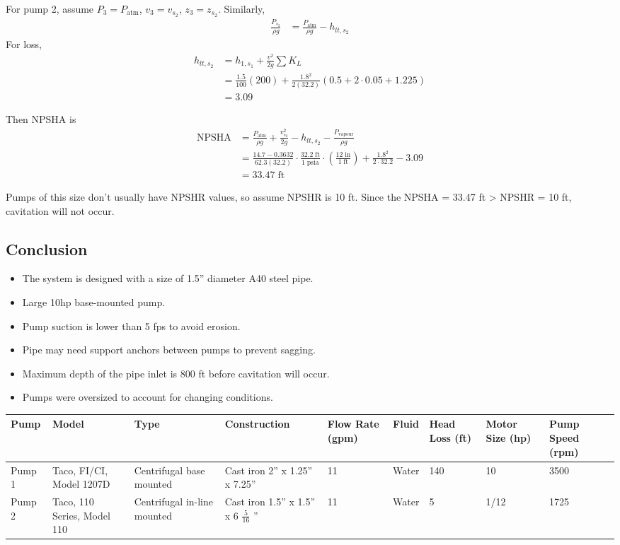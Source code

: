 For pump 2, assume $P_3 = P_\text{atm}$, $v_3 = v_{s_2}$, $z_3 = z_{s_2}$. Similarly,
\begin{align*}
\frac{P_{s_2}}{\rho g} &= \frac{P_\text{atm}}{\rho g} - h_{lt, s_2}
\end{align*}
For loss, 
\begin{align*}
    h_{lt, s_2} &= h_{1, s_1} + \frac{v^2}{2g} \sum K_L \\
    &= \frac{1.5}{100} (200) + \frac{1.8^2}{2(32.2)} (0.5 + 2 \cdot 0.05 + 1.225) \\
    &= 3.09
\end{align*}

Then NPSHA is
\begin{align*}
    \text{NPSHA} &= \frac{P_\text{atm}}{\rho g} + \frac{v_{s_2}^2}{2g} - h_{lt, s_2} - \frac{P_{\text{vapour}}}{\rho g} \\
    &= \frac{14.7 - 0.3632}{62.3 (32.2)} \cdot \frac{32.2 \; \text{ft}}{1 \; \text{psia}} \cdot \left(\frac{12 \; \text{in}}{1 \; \text{ft}}\right) + \frac{1.8^2}{2 \cdot 32.2} - 3.09 \\
    &= 33.47 \; \text{ft}
\end{align*}
\begin{framed}
    Pumps of this size don't usually have NPSHR values, so assume NPSHR is 10 ft. Since the NPSHA = 33.47 ft > NPSHR = 10 ft, cavitation will not occur.
\end{framed}
\subsection{Conclusion}
\begin{itemize}
    \item The system is designed with a size of 1.5'' diameter A40 steel pipe.
    \item Large 10hp base-mounted pump. 
    \item Pump suction is lower than 5 fps to avoid erosion.
    \item Pipe may need support anchors between pumps to prevent sagging.
    \item Maximum depth of the pipe inlet is 800 ft before cavitation will occur.
    \item Pumps were oversized to account for changing conditions.
\end{itemize}
\begin{table}[H]
    \centering
    \begin{tabular}{|p{1cm}|p{2cm}|p{2cm}|p{2.5cm}|p{1cm}|p{1cm}|p{1cm}|p{1cm}|p{1cm}|}
        \hline
        Pump & Model & Type & Construction & Flow Rate (gpm) & Fluid & Head Loss (ft) & Motor Size (hp) & Pump Speed (rpm) \\
        \hline
        Pump 1 & Taco, FI/CI, Model 1207D & Centrifugal base mounted & Cast iron 2'' x 1.25'' x 7.25'' & 11 & Water & 140 & 10 & 3500 \\
        Pump 2 & Taco, 110 Series, Model 110 & Centrifugal in-line mounted & Cast iron 1.5'' x 1.5'' x 6 $\frac{5}{16}$ '' & 11 & Water & 5 & 1/12 & 1725 \\
        \hline
    \end{tabular}
\end{table}